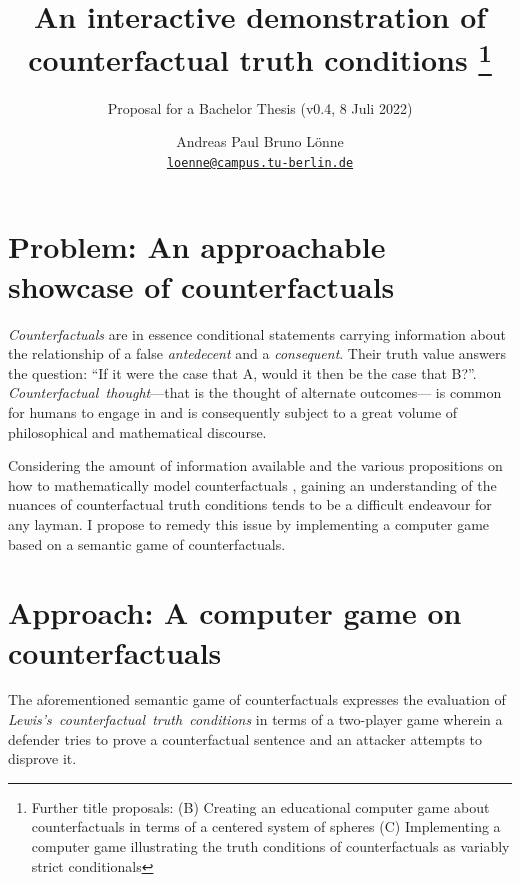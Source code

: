 \documentclass[a4paper,american]{paper}
\providecommand*{\code}[1]{\texttt{#1}}
\begin{document}
\title{An interactive demonstration of counterfactual truth conditions%
	\footnote{Further title proposals:
		(B) Creating an educational computer game about counterfactuals in terms of a centered system of spheres
		(C) Implementing a computer game illustrating the truth conditions of counterfactuals as variably strict conditionals
	}
}

\subtitle{Proposal for a Bachelor Thesis (v0.4, 8 Juli 2022)}

\author{%
	Andreas Paul Bruno Lönne\\
	\code{\href{mailto:loenne@campus.tu-berlin.de}{loenne@campus.tu-berlin.de}}
}


\maketitle

\section*{Problem: An approachable showcase of counterfactuals}
{\it Counterfactuals} are in essence conditional statements carrying information about the relationship of a false {\it antedecent} and a {\it consequent}. Their truth value answers the question: ``If it were the case that A, would it then be the case that B?''. {\it Counterfactual~thought}---that is the thought of alternate outcomes---\cite{byrne_counterfactual_thought_2016} is common for humans to engage in and is consequently subject to a great volume of philosophical and mathematical discourse. 

Considering the amount of information available and the various propositions on how to mathematically model counterfactuals \cite{stalnaker_theory_1968, stalnaker_semantic_1970,  lewis_counterfactuals_1973}, gaining an understanding of the nuances of counterfactual truth conditions tends to be a difficult endeavour for any layman. I propose to remedy this issue by implementing a computer game based on a semantic game of counterfactuals.

\section*{Approach: A computer game on counterfactuals}
The aforementioned semantic game of counterfactuals expresses the evaluation of {\it Lewis's~counterfactual~truth~conditions} \cite{lewis_counterfactuals_1973} in terms of a two-player game wherein a defender tries to prove a counterfactual sentence and an attacker attempts to disprove it.
\end{document}
